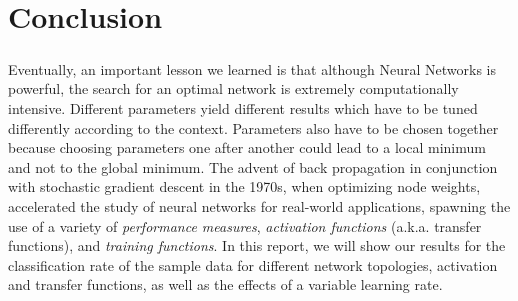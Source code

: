 \documentclass[a4paper,12pt,oneside,final]{report}
\begin{document}
\chapter{Conclusion}
\paragraph{}
Eventually, an important lesson we learned is that although Neural Networks is powerful, the search for an optimal network is extremely computationally intensive.  Different parameters yield different results which have to be tuned differently according to the context. Parameters also have to be chosen together because choosing parameters one after another could lead to a local minimum and not to the global minimum. The advent of back propagation in conjunction with stochastic gradient descent in the 1970s, when optimizing node weights, accelerated the study of neural networks for real-world applications, spawning the use of a variety of \emph{performance measures}, \emph{activation functions} (a.k.a. transfer functions), and \emph{training functions}.  In this report, we will show our results for the classification rate of the sample data for different network topologies, activation and transfer functions, as well as the effects of a variable learning rate. 




\begin{appendices}

\end{appendices}
\end{document}
